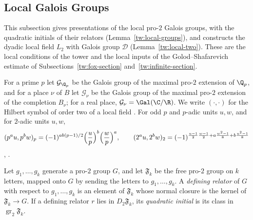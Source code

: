 \subsection{Local Galois Groups}\label{tw:local-section}
This subsection gives presentations of the local pro-$2$ Galois groups, with
the quadratic initials of their relators (Lemma~\ref{tw:local-groups}), and
constructs the dyadic local field $L_2$ with Galois group $\mathcal D$
(Lemma~\ref{tw:local-two}). These are the local conditions of the tower and
the local inputs of the Golod--Shafarevich estimate of
Subsections~\ref{tw:fox-section} and~\ref{tw:infinite-section}.

For a prime $p$ let $\mathcal G_{\Q_p}$ be the Galois group of the maximal
pro-$2$ extension of $\Q_p$, and for a place $\nu$ of $B$ let $\mathcal G_\nu$
be the Galois group of the maximal pro-$2$ extension of the completion
$B_\nu$; for a real place, $\mathcal G_\nu=\Gal(\C/\R)$. We write
$(\cdot,\cdot)$ for the Hilbert symbol
of order two of a local field \cite[Chapter~III, Section~4]{MilneCFT}. For
odd $p$ and $p$-adic units $u,w$, and for $2$-adic units $u,w$,
\begin{equation}\label{tw:hilbert}
 (p^au,p^bw)_p=(-1)^{ab(p-1)/2}\Bigl(\frac up\Bigr)^b\Bigl(\frac wp\Bigr)^a,
 \qquad
 (2^au,2^bw)_2=(-1)^{\frac{u-1}2\frac{w-1}2+a\frac{w^2-1}8+b\frac{u^2-1}8}
\end{equation}
\cite[Chapter~III, Theorem~1]{SerreCourse}, \cite[Chapter~VIII,
Section~5]{MilneCFT}.

\begin{definition}\label{tw:relator}
Let $g_1,\dots,g_k$ generate a pro-$2$ group $G$, and let $\mathfrak F_k$ be
the free pro-$2$ group on $k$ letters, mapped onto $G$ by sending the letters
to $g_1,\dots,g_k$. A \emph{defining relator} of $G$ with respect to
$g_1,\dots,g_k$ is an element of $\mathfrak F_k$ whose normal closure is the
kernel of $\mathfrak F_k\to G$. If a defining relator $r$ lies in
$D_2\mathfrak F_k$, its \emph{quadratic initial} is its class in
$\operatorname{gr}_2\mathfrak F_k$.
\end{definition}

